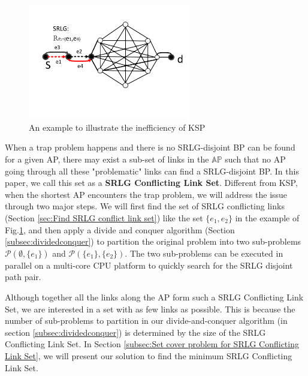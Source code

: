 \begin{figure}[!h]
\centering
\includegraphics[width=2.8in]{franz/KSPproblem}
  \caption{An example to illustrate the inefficiency of KSP}
  \label{fig:KSPproblem}
\end{figure}

When a trap problem happens and there is no SRLG-disjoint BP can be found for a given AP, there may exist a sub-set of links in the $\mathbb{AP}$ such that no AP going through all these "problematic" links can find a SRLG-disjoint BP. In this paper, we call this set as a \textbf{SRLG Conflicting Link Set}. Different from KSP,  when the shortest AP encounters the trap problem, we will address the issue through two major steps. We will first find the set of SRLG conflicting links  (Section \ref{sec:Find SRLG conflict link set}) like the set  $\{e_1,e_2\}$ in the example of Fig.\ref{fig:KSPproblem}, and then apply a divide and conquer algorithm (Section \ref{subsec:dividedconquer}) to partition the original problem into two sub-problems $\mathcal{P}(\emptyset,\{e_1\})$ and $\mathcal{P}(\{e_1\},\{e_2\})$. The two sub-problems can be executed in parallel on a multi-core CPU platform to quickly search for the SRLG disjoint path pair.





Although together all the links along the AP form such a SRLG Conflicting Link Set, we are interested in a set with as few links as possible. This is because the number of sub-problems to partition in our divide-and-conquer algorithm (in section \ref{subsec:dividedconquer}) is determined by  the size of the SRLG Conflicting Link Set. In Section \ref{subsec:Set cover problem for SRLG Conflicting Link Set}, we will present our solution to find the minimum SRLG Conflicting Link Set.


%

